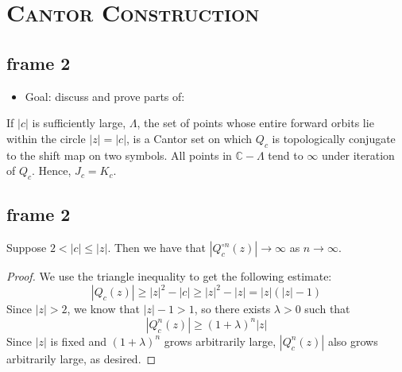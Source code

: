 \documentclass[xcolor=x11names,compress]{beamer}
\renewcommand{\(}{\begin{columns}}
\renewcommand{\)}{\end{columns}}
\newcommand{\<}[1]{\begin{column}{#1}}
\renewcommand{\>}{\end{column}}
\begin{document}
\section{\scshape Cantor Construction}


\subsection{frame 2}
\begin{frame}

\begin{itemize}
\item Goal: discuss and prove parts of:
\end{itemize}

\vspace{1cm}

\begin{theorem}
If $|c|$ is sufficiently large, $\Lambda$, the set of points whose entire forward orbits lie within the circle $|z|=|c|$, is a Cantor set on which $Q_c$ is topologically conjugate to the shift map on two symbols. All points in $\mathbb{C} - \Lambda$ tend to $\infty$ under iteration of $Q_c$. Hence, $J_c=K_c$.
\end{theorem}

\end{frame}


\subsection{frame 2}
\begin{frame}

\begin{theorem} 
Suppose $2 < |c| \le |z|$. Then we have that $|Q_c^{\circ n}(z)| \rightarrow \infty$ as $n \rightarrow \infty$.
\end{theorem}

\begin{proof}
We use the triangle inequality to get the following estimate:
\begin{equation}
    |Q_c(z)| \geq |z|^2 - |c| \geq |z|^2 - |z| = |z|(|z|-1)
\end{equation}
Since $|z| > 2$, we know that $|z|-1>1$, so there exists $\lambda > 0$ such that 
\begin{equation}
    |Q_c^n(z)| \geq (1+\lambda)^n|z|
\end{equation}
Since $|z|$ is fixed and $(1+\lambda)^n$ grows arbitrarily large, $|Q_c^n(z)|$ also grows arbitrarily large, as desired.
\end{proof}

\end{frame}
\end{document}
